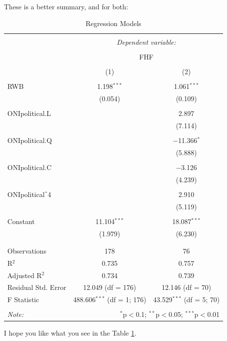 \documentclass[11pt]{article}
\begin{document}
\clearpage
These is a better summary, and for both:

\begin{table}[!htbp] \centering 
  \caption{Regression Models} 
  \label{regs} 
\begin{tabular}{@{\extracolsep{5pt}}lcc} 
\\[-1.8ex]\hline 
\hline \\[-1.8ex] 
 & \multicolumn{2}{c}{\textit{Dependent variable:}} \\ 
\cline{2-3} 
\\[-1.8ex] & \multicolumn{2}{c}{FHF} \\ 
\\[-1.8ex] & (1) & (2)\\ 
\hline \\[-1.8ex] 
 RWB & 1.198$^{***}$ & 1.061$^{***}$ \\ 
  & (0.054) & (0.109) \\ 
  & & \\ 
 ONIpolitical.L &  & 2.897 \\ 
  &  & (7.114) \\ 
  & & \\ 
 ONIpolitical.Q &  & $-$11.366$^{*}$ \\ 
  &  & (5.888) \\ 
  & & \\ 
 ONIpolitical.C &  & $-$3.126 \\ 
  &  & (4.239) \\ 
  & & \\ 
 ONIpolitical$\hat{\mkern6mu}$4 &  & 2.910 \\ 
  &  & (5.119) \\ 
  & & \\ 
 Constant & 11.104$^{***}$ & 18.087$^{***}$ \\ 
  & (1.979) & (6.230) \\ 
  & & \\ 
\hline \\[-1.8ex] 
Observations & 178 & 76 \\ 
R$^{2}$ & 0.735 & 0.757 \\ 
Adjusted R$^{2}$ & 0.734 & 0.739 \\ 
Residual Std. Error & 12.049 (df = 176) & 12.146 (df = 70) \\ 
F Statistic & 488.606$^{***}$ (df = 1; 176) & 43.529$^{***}$ (df = 5; 70) \\ 
\hline 
\hline \\[-1.8ex] 
\textit{Note:}  & \multicolumn{2}{r}{$^{*}$p$<$0.1; $^{**}$p$<$0.05; $^{***}$p$<$0.01} \\ 
\end{tabular} 
\end{table} 
I hope you like what you see in the Table \ref{regs}.
\end{document}
